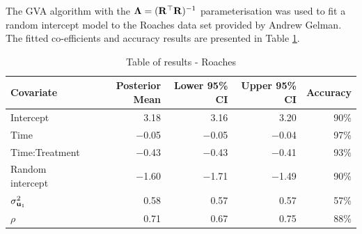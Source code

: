\documentclass{amsart}[12pt]
\begin{document}
	The GVA algorithm with the ${\boldsymbol \Lambda} = ({\bf R}^\top {\bf R})^{-1}$ parameterisation was used to fit a random
	intercept model to the Roaches data set provided by Andrew Gelman. The fitted co-efficients and accuracy
	results are presented in Table \ref{tab:application_roaches}.
		
		
		
	\begin{table}
		\caption{Table of results - Roaches}
		\label{tab:application_roaches}
		\begin{tabular}{|l|rrrr|}
			\hline
			Covariate          & Posterior Mean & Lower 95\% CI & Upper 95\% CI & Accuracy \\
			\hline
			Intercept          & 3.18           & 3.16          & 3.20          & 90\%     \\
			Time               & $-$0.05        & $-$0.05       & $-$0.04       & 97\%     \\
			Time:Treatment     & $-$0.43        & $-$0.43       & $-$0.41       & 93\%     \\
			Random intercept   & $-$1.60        & $-$1.71       & $-$1.49       & 90\%     \\
			$\sigma^2_{{\bf u}_1}$ & 0.58           & 0.57          & 0.57          & 57\%     \\
			$\rho$             & 0.71           & 0.67          & 0.75          & 88\%     \\
			\hline
		\end{tabular}
	\end{table}
		
\end{document}
